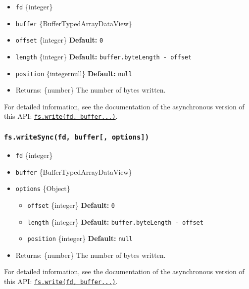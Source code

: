 \begin{itemize}
\tightlist
\item
  \texttt{fd} \{integer\}
\item
  \texttt{buffer} \{Buffer\textbar TypedArray\textbar DataView\}
\item
  \texttt{offset} \{integer\} \textbf{Default:} \texttt{0}
\item
  \texttt{length} \{integer\} \textbf{Default:}
  \texttt{buffer.byteLength\ -\ offset}
\item
  \texttt{position} \{integer\textbar null\} \textbf{Default:}
  \texttt{null}
\item
  Returns: \{number\} The number of bytes written.
\end{itemize}

For detailed information, see the documentation of the asynchronous
version of this API:
\hyperref[fswritefd-buffer-offset-length-position-callback]{\texttt{fs.write(fd,\ buffer...)}}.

\subsubsection{\texorpdfstring{\texttt{fs.writeSync(fd,\ buffer{[},\ options{]})}}{fs.writeSync(fd, buffer{[}, options{]})}}\label{fs.writesyncfd-buffer-options}

\begin{itemize}
\tightlist
\item
  \texttt{fd} \{integer\}
\item
  \texttt{buffer} \{Buffer\textbar TypedArray\textbar DataView\}
\item
  \texttt{options} \{Object\}

  \begin{itemize}
  \tightlist
  \item
    \texttt{offset} \{integer\} \textbf{Default:} \texttt{0}
  \item
    \texttt{length} \{integer\} \textbf{Default:}
    \texttt{buffer.byteLength\ -\ offset}
  \item
    \texttt{position} \{integer\} \textbf{Default:} \texttt{null}
  \end{itemize}
\item
  Returns: \{number\} The number of bytes written.
\end{itemize}

For detailed information, see the documentation of the asynchronous
version of this API:
\hyperref[fswritefd-buffer-offset-length-position-callback]{\texttt{fs.write(fd,\ buffer...)}}.

